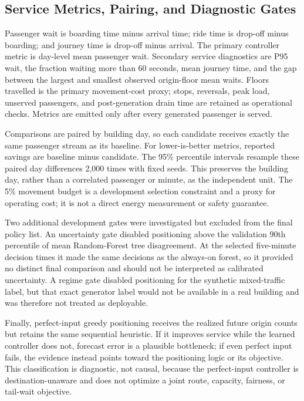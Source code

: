 \documentclass[12pt]{article}
\begin{document}
\subsection{Service Metrics, Pairing, and Diagnostic Gates}

Passenger wait is boarding time minus arrival time; ride time is drop-off minus
boarding; and journey time is drop-off minus arrival. The primary controller
metric is day-level mean passenger wait. Secondary service diagnostics are P95
wait, the fraction waiting more than 60 seconds, mean journey time, and the
gap between the largest and smallest observed origin-floor mean waits. Floors
travelled is the primary movement-cost proxy; stops, reversals, peak load,
unserved passengers, and post-generation drain time are retained as operational
checks. Metrics are emitted only after every generated passenger is served.

Comparisons are paired by building day, so each candidate receives exactly the
same passenger stream as its baseline. For lower-is-better metrics, reported
savings are baseline minus candidate. The 95\% percentile intervals resample
these paired day differences 2,000 times with fixed seeds. This preserves the
building day, rather than a correlated passenger or minute, as the independent
unit. The 5\% movement budget is a development selection constraint and a proxy
for operating cost; it is not a direct energy measurement or safety guarantee.

Two additional development gates were investigated but excluded from the final
policy list. An uncertainty gate disabled positioning above the validation
90th percentile of mean Random-Forest tree disagreement. At the selected
five-minute decision times it made the same decisions as the always-on forest,
so it provided no distinct final comparison and should not be interpreted as
calibrated uncertainty. A regime gate disabled positioning for the synthetic
mixed-traffic label, but that exact generator label would not be available in a
real building and was therefore not treated as deployable.

Finally, perfect-input greedy positioning receives the realized future origin
counts but retains the same sequential heuristic. If it improves service while
the learned controller does not, forecast error is a plausible bottleneck; if
even perfect input fails, the evidence instead points toward the positioning
logic or its objective. This classification is diagnostic, not causal, because
the perfect-input controller is destination-unaware and does not optimize a
joint route, capacity, fairness, or tail-wait objective.
\end{document}
